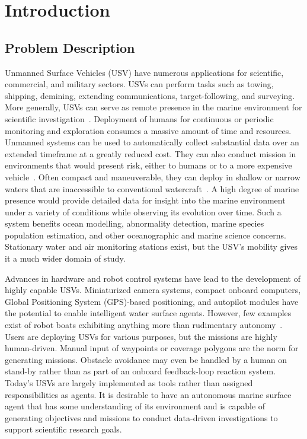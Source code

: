 \documentclass{tamuccthesis}
\begin{document}
\setlength{\headheight}{12pt}

\chapter{Introduction}

\section{Problem Description}

Unmanned Surface Vehicles (USV) have numerous applications for scientific, commercial, and military sectors. USVs can perform tasks such as towing, shipping, demining, extending communications, target-following, and surveying. More generally, USVs can serve as remote presence in the marine environment for scientific investigation~\cite{manley2008unmanned}. Deployment of humans for continuous or periodic monitoring and exploration consumes a massive amount of time and resources. Unmanned systems can be used to automatically collect substantial data over an extended timeframe at a greatly reduced cost. They can also conduct mission in environments that would present risk, either to humans or to a more expensive vehicle~\cite{liu:2016}. Often compact and maneuverable, they can deploy in shallow or narrow waters that are inaccessible to conventional watercraft~\cite{liu:2016}. A high degree of marine presence would provide detailed data for insight into the marine environment under a variety of conditions while observing its evolution over time. Such a system benefits ocean modelling, abnormality detection, marine species population estimation, and other oceanographic and marine science concerns. Stationary water and air monitoring stations exist, but the USV's mobility gives it a much wider domain of study. 

Advances in hardware and robot control systems have lead to the development of highly capable USVs. Miniaturized camera systems, compact onboard computers,  Global Positioning System (GPS)-based positioning, and autopilot modules have the potential to enable intelligent water surface agents. However, few examples exist of robot boats exhibiting anything more than rudimentary autonomy~\cite{bertram2008unmanned, liu:2016}. Users are deploying USVs for various purposes, but the missions are highly human-driven. Manual input of waypoints or coverage polygons are the norm for generating missions. Obstacle avoidance may even be handled by a human on stand-by rather than as part of an onboard feedback-loop reaction system. Today's USVs are largely implemented as tools rather than assigned responsibilities as agents. It is desirable to have an autonomous marine surface agent that has some understanding of its environment and is capable of generating objectives and missions to conduct data-driven investigations to support scientific research goals.
\end{document}
